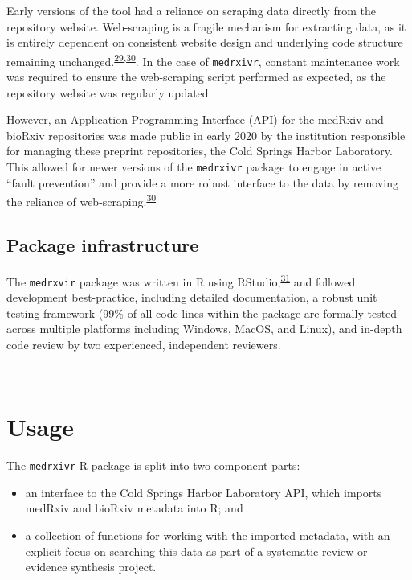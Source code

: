 \documentclass[a4paper, twoside]{templates/ociamthesis}
\providecommand{\tightlist}{%
  \setlength{\itemsep}{0pt}\setlength{\parskip}{0pt}}
\begin{document}
Early versions of the tool had a reliance on scraping data directly from the repository website. Web-scraping is a fragile mechanism for extracting data, as it is entirely dependent on consistent website design and underlying code structure remaining unchanged.\textsuperscript{\protect\hyperlink{ref-shaw2002}{29},\protect\hyperlink{ref-laprie1992}{30}}. In the case of \texttt{medrxivr}, constant maintenance work was required to ensure the web-scraping script performed as expected, as the repository website was regularly updated.

However, an Application Programming Interface (API) for the medRxiv and bioRxiv repositories was made public in early 2020 by the institution responsible for managing these preprint repositories, the Cold Springs Harbor Laboratory. This allowed for newer versions of the \texttt{medrxivr} package to engage in active ``fault prevention'' and provide a more robust interface to the data by removing the reliance of web-scraping.\textsuperscript{\protect\hyperlink{ref-laprie1992}{30}}

\hypertarget{package-infrastructure}{%
\subsection{Package infrastructure}\label{package-infrastructure}}

The \texttt{medrxvir} package was written in R using RStudio,\textsuperscript{\protect\hyperlink{ref-rcoreteam2019}{31}} and followed development best-practice, including detailed documentation, a robust unit testing framework (99\% of all code lines within the package are formally tested across multiple platforms including Windows, MacOS, and Linux), and in-depth code review by two experienced, independent reviewers.

~

\hypertarget{usage}{%
\section{Usage}\label{usage}}

The \texttt{medrxivr} R package is split into two component parts:

\begin{itemize}
\tightlist
\item
  an interface to the Cold Springs Harbor Laboratory API, which imports medRxiv and bioRxiv metadata into R; and
\item
  a collection of functions for working with the imported metadata, with an explicit focus on searching this data as part of a systematic review or evidence synthesis project.
\end{itemize}
\end{document}
